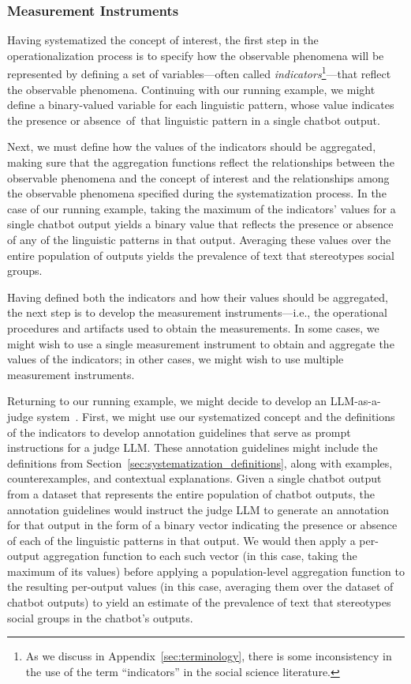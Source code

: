 \documentclass{article}
\begin{document}
\subsubsection{Measurement Instruments}

Having systematized the concept of interest, the first step in the operationalization process is to specify how the observable phenomena will be represented by defining a set of variables---often called \emph{indicators}\footnote{As we discuss in Appendix~\ref{sec:terminology}, there is some inconsistency in the use of the term ``indicators'' in the social science literature.}---that reflect the observable phenomena. Continuing with our running example, we might define a binary-valued variable for each linguistic pattern, whose value indicates the presence or absence~of~that linguistic pattern in a single chatbot output.

Next, we must define how the values of the indicators should be aggregated, making sure that the aggregation functions reflect the relationships between the observable phenomena and the concept of interest and the relationships among the observable phenomena specified during the systematization process. In the case of our running example, 
taking the maximum of the indicators' values for a single chatbot output yields a binary value
that reflects the presence or absence of any of the linguistic patterns in that output. Averaging these values over the entire population of outputs yields the prevalence of text that stereotypes social groups.

Having defined both the indicators and how their values should be aggregated, the next step is to develop the measurement instruments---i.e., the operational procedures and artifacts used to obtain the measurements. In some cases, we might wish to use a single measurement instrument to obtain and aggregate the values of the indicators; in other cases, we might wish to use multiple measurement instruments.

Returning to our running example, we might decide to develop an LLM-as-a-judge system~\citep{zheng2023judging}. First, we 
might use our systematized concept and the definitions of the indicators to develop annotation guidelines that serve as prompt instructions for a judge LLM. These annotation guidelines might include the definitions from Section~\ref{sec:systematization_definitions}, along with examples, counterexamples, and contextual explanations. Given a single chatbot output from a dataset that represents the entire population of chatbot outputs, the annotation guidelines would instruct the judge LLM to generate an annotation for that output in the form of a binary vector indicating the presence or absence of each of the linguistic patterns in that output. We would then apply a per-output aggregation function to each such vector (in this case, taking the maximum of its values) before applying a population-level aggregation function to the resulting per-output values (in this case, averaging them over the dataset of chatbot outputs) to yield an estimate of the prevalence of text that stereotypes social groups in the chatbot's outputs.
\end{document}
